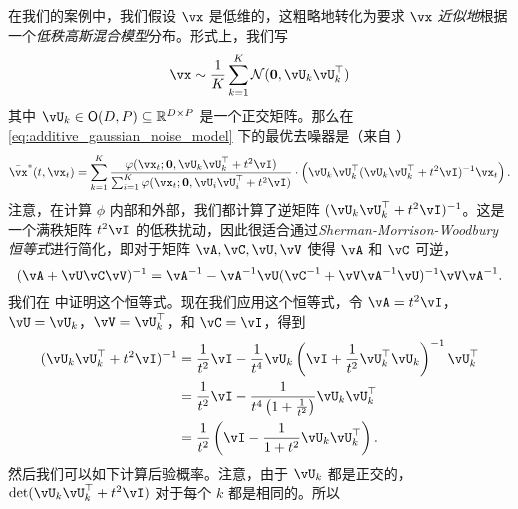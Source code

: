 \documentclass[../../book-main.tex]{subfiles}
\begin{document}
在我们的案例中，我们假设 \(\vx\) 是低维的，这粗略地转化为要求 \(\vx\) \textit{近似地}根据一个\textit{低秩高斯混合模型}分布。形式上，我们写
\begin{equation}\label{eq:MoG1}
	\vx \sim \frac{1}{K}\sum_{k = 1}^{K}\dNorm(\vzero, \vU_{k}\vU_{k}^{\top})
\end{equation}
其中 \(\vU_{k} \in \O(D, P) \subseteq \R^{D \times P}\) 是一个正交矩阵。那么在 \eqref{eq:additive_gaussian_noise_model} 下的最优去噪器是（来自 ）
\begin{equation}
	\bar{\vx}^{\ast}(t, \vx_{t}) = \sum_{k = 1}^{K}\frac{\phi(\vx_{t} ; \vzero,
	\vU_{k}\vU_{k}^{\top} + t^{2}\vI)}{\sum_{i = 1}^{K}\phi(\vx_{t} ; \vzero, \vU_{i}\vU_{i}^{\top} + t^{2}\vI)}\cdot\bp{\vU_{k}\vU_{k}^{\top}(\vU_{k}\vU_{k}^{\top} + t^{2}\vI)^{-1}\vx_{t}}.
\end{equation}
注意，在计算 \(\phi\) 内部和外部，我们都计算了逆矩阵 \((\vU_{k}\vU_{k}^{\top} + t^{2}\vI)^{-1}\)。这是一个满秩矩阵 \(t^{2}\vI\) 的低秩扰动，因此很适合通过\textit{Sherman-Morrison-Woodbury 恒等式}进行简化，即对于矩阵 \(\vA, \vC, \vU, \vV\) 使得 \(\vA\) 和 \(\vC\) 可逆，
\begin{equation}\label{eq:sherman_morrison_woodbury}
	(\vA + \vU\vC\vV)^{-1} = \vA^{-1} - \vA^{-1}\vU(\vC^{-1} + \vV\vA^{-1}\vU)^{-1}\vV\vA^{-1}.
\end{equation}
我们在  中证明这个恒等式。现在我们应用这个恒等式，令 \(\vA = t^{2}\vI\)，\(\vU = \vU_{k}\)，\(\vV = \vU_{k}^{\top}\)，和 \(\vC = \vI\)，得到
\begin{align}
	(\vU_{k}\vU_{k}^{\top} + t^{2}\vI)^{-1} 
	&= \frac{1}{t^{2}}\vI - \frac{1}{t^{4}}\vU_{k}\bp{\vI + \frac{1}{t^{2}}\vU_{k}^{\top}\vU_{k}}^{-1}\vU_{k}^{\top} \\
	&= \frac{1}{t^{2}}\vI - \frac{1}{t^{4}\bp{1 + \frac{1}{t^{2}}}}\vU_{k}\vU_{k}^{\top} \\
	&= \frac{1}{t^{2}}\bp{\vI - \frac{1}{1 + t^{2}}\vU_{k}\vU_{k}^{\top}}.
\end{align}
然后我们可以如下计算后验概率。注意，由于 \(\vU_{k}\) 都是正交的，\(\det(\vU_{k}\vU_{k}^{\top} + t^{2}\vI)\) 对于每个 \(k\) 都是相同的。所以
\end{document}
